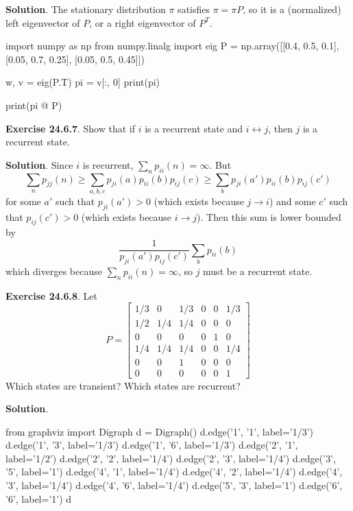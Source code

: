 \textbf{Solution}. The stationary distribution \(\pi\) satisfies
\(\pi = \pi P\), so it is a (normalized) left eigenvector of \(P\), or a
right eigenvector of \(P^T\).

\begin{python}
import numpy as np
from numpy.linalg import eig
P = np.array([[0.4, 0.5, 0.1], [0.05, 0.7, 0.25], [0.05, 0.5, 0.45]])
\end{python}

\begin{python}
w, v = eig(P.T)
pi = v[:, 0]
print(pi)
\end{python}
\begin{console}
[0.11041049 0.89708523 0.42784065]
\end{console}

\begin{python}
print(pi @ P)
\end{python}
\begin{console}
[0.11041049 0.89708523 0.42784065]
\end{console}

\textbf{Exercise 24.6.7}. Show that if \(i\) is a recurrent state and
\(i \leftrightarrow j\), then \(j\) is a recurrent state.

\textbf{Solution}.
Since \(i\) is recurrent, \(\sum_{n} p_{ii}(n) = \infty\). But
\[
\sum_{n} p_{jj}(n) \geq \sum_{a, b, c} p_{ji}(a) p_{ii}(b) p_{ij}(c) \geq \sum_b p_{ji}(a') p_{ii}(b) p_{ij}(c')
\]
for some \(a'\) such that \(p_{ji}(a') > 0\) (which exists because
\(j \rightarrow i\)) and some \(c'\) such that \(p_{ij}(c') > 0\) (which
exists because \(i \rightarrow j\)). Then this sum is lower bounded by
\[
\frac{1}{p_{ji}(a') p_{ij}(c')} \sum_b p_{ii}(b)
\]
which diverges because \(\sum_{n} p_{ii}(n) = \infty\), so \(j\) must be a
recurrent state.

\textbf{Exercise 24.6.8}. Let
\[
P = \begin{bmatrix}
1/3 & 0   & 1/3 & 0 & 0 & 1/3 \\
1/2 & 1/4 & 1/4 & 0 & 0 & 0   \\
0   & 0   & 0   & 0 & 1 & 0   \\
1/4 & 1/4 & 1/4 & 0 & 0 & 1/4 \\
0   & 0   & 1   & 0 & 0 & 0   \\
0   & 0   & 0   & 0 & 0 & 1
\end{bmatrix}
\]
Which states are transient? Which states are recurrent?

\textbf{Solution}.

\begin{python}
from graphviz import Digraph
d = Digraph()
d.edge('1', '1', label='1/3')
d.edge('1', '3', label='1/3')
d.edge('1', '6', label='1/3')
d.edge('2', '1', label='1/2')
d.edge('2', '2', label='1/4')
d.edge('2', '3', label='1/4')
d.edge('3', '5', label='1')
d.edge('4', '1', label='1/4')
d.edge('4', '2', label='1/4')
d.edge('4', '3', label='1/4')
d.edge('4', '6', label='1/4')
d.edge('5', '3', label='1')
d.edge('6', '6', label='1')
d
\end{python}

